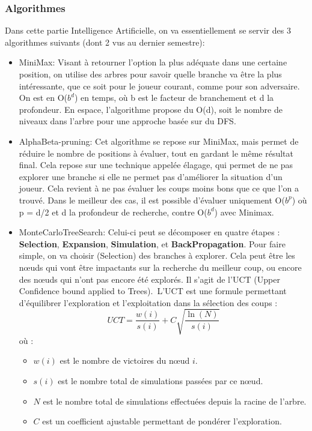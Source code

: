 \documentclass{article}
\begin{document}
\subsubsection{Algorithmes}
Dans cette partie Intelligence Artificielle, on va essentiellement se servir des 3 algorithmes suivants (dont 2 vus au dernier semestre):
\begin{itemize}
    \item MiniMax: Visant à retourner l'option la plus adéquate dans une certaine position, on utilise des arbres pour savoir quelle branche va être la
    plus intéressante, que ce soit pour le joueur courant, comme pour son adversaire. On est en O($b^d$) en temps, où b est le facteur de branchement et d la profondeur.
    En espace, l'algorithme propose du O(d), soit le nombre de niveaux dans l'arbre pour une approche basée sur du DFS.
    \item AlphaBeta-pruning: Cet algorithme se repose sur MiniMax, mais permet de réduire le nombre de positions à évaluer, tout en gardant le même résultat final. 
    Cela repose sur une technique appelée élagage, qui permet de ne pas explorer une branche si elle ne permet pas d'améliorer la situation 
    d'un joueur. Cela revient à ne pas évaluer les coups moins bons que ce que l'on a trouvé. Dans le meilleur des cas, il est possible d'évaluer uniquement 
    O($b^p$) où p = d/2 et d la profondeur de recherche, contre O($b^d$) avec Minimax.
    \item MonteCarloTreeSearch:
    Celui-ci peut se décomposer en quatre étapes : \textbf{Selection}, \textbf{Expansion}, \textbf{Simulation}, et \textbf{BackPropagation}. Pour faire simple, on va choisir (Selection) des branches à explorer. Cela peut être les nœuds qui vont être impactants sur la recherche du meilleur coup, ou encore des nœuds qui n'ont pas encore été explorés. Il s'agit de l'UCT (Upper Confidence bound applied to Trees).\
    L'UCT est une formule permettant d'équilibrer l'exploration et l'exploitation dans la sélection des coups :
    \begin{equation}
    UCT = \frac{w(i)}{s(i)} + C \sqrt{\frac{\ln(N)}{s(i)}}
    \end{equation}
    où :
    \begin{itemize}
        \item $w(i)$ est le nombre de victoires du nœud $i$.
        \item $s(i)$ est le nombre total de simulations passées par ce nœud.
        \item $N$ est le nombre total de simulations effectuées depuis la racine de l'arbre.
        \item $C$ est un coefficient ajustable permettant de pondérer l'exploration.\
    \end{itemize} 


\end{itemize}
\end{document}
